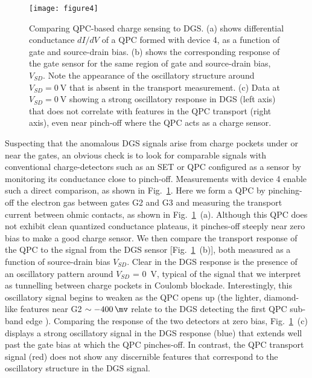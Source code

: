 \begin{figure}
  \texttt{[image: figure4]}
  \caption{\label{fig:pock_fig4} Comparing QPC-based charge sensing to DGS. (a) shows differential conductance $dI/dV$ of a QPC formed with device 4, as a function of gate and source-drain bias. (b) shows the corresponding response of the gate sensor for the same region of gate and source-drain bias, $V_{SD}$. Note the appearance of the oscillatory structure around $V_{SD} = \SI{0}{\volt}$ that is absent in the transport measurement. (c) Data at  $V_{SD} = \SI{0}{\volt}$ showing a strong oscillatory response in DGS  (left axis) that does not correlate with features in the QPC transport (right axis), even near pinch-off where the QPC acts as a charge sensor.}
\end{figure}

Suspecting that the anomalous DGS signals arise from charge pockets under or near the gates, an obvious check is to look for comparable signals with conventional charge-detectors such as an SET or QPC configured as a sensor by monitoring its conductance close to pinch-off. Measurements with device 4 enable such a direct comparison, as shown in Fig.~\ref{fig:pock_fig4}. Here we form a QPC by pinching-off the electron gas between gates G2 and G3 and measuring the transport current between ohmic contacts, as shown in Fig.~\ref{fig:pock_fig4}~(a). Although this QPC does not exhibit clean quantized conductance plateaus, it pinches-off steeply near zero bias to make a good charge sensor. We then compare the transport response of the QPC to the signal from the DGS sensor [Fig.~\ref{fig:pock_fig4}~(b)], both measured as a function of source-drain bias  $V_{SD}$. Clear in the DGS response is the presence of an oscillatory pattern around $V_{SD}$ = \SI{0}{\volt}, typical of the signal that we interpret as tunnelling between charge pockets in Coulomb blockade. Interestingly, this oscillatory signal begins to weaken as the QPC opens up (the lighter, diamond-like features near G2 $\sim \SI{-400}{\mv}$ relate to the DGS detecting the first QPC sub-band edge \cite{MC_paper}). Comparing the response of the two detectors at zero bias, Fig.~\ref{fig:pock_fig4}~(c) displays a strong oscillatory signal in the DGS response (blue) that extends well past the gate bias at which the QPC pinches-off. In contrast, the QPC transport signal (red) does not show any discernible features that correspond to the oscillatory structure in the DGS signal.

